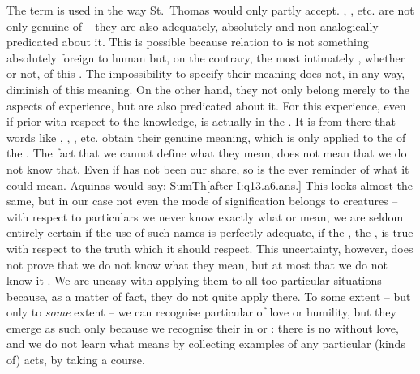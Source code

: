 The term  is used in the way St.~Thomas would only partly
accept.
, , etc. are not only genuine  of 
-- they are also adequately, absolutely and non-analogically predicated about
it.  This is possible because  relation to  is not
something absolutely foreign to human  but, on the contrary, the
most intimately , whether  or not,  of
this . The impossibility to specify  their meaning
does not, in any way, diminish  of this meaning. On the other
hand, they not only belong merely  to the aspects of
 experience, but are also predicated  about it.
For this experience, even if prior with respect to the 
knowledge, is actually  in the . It is from there
that words like , , , etc.  obtain their
genuine meaning, which is only  applied to the 
 of the . The fact that we cannot define
 what they mean, does not mean that we do not know that. Even if
 has not been our share, so  is the ever
 reminder of what it could mean. Aquinas
would say: \citet{as regards what these names signify, they are applied
  primarily to God but as regards the imposition of the names, they are
  primarily applied to creatures which we know first -- hence they have a mode
  of signification which belongs to creatures.}{SumTh}{[after I:q13.a6.ans.]} This
looks almost the same, but in our case not even the mode of signification
belongs to creatures -- with respect to particulars we never know exactly what
 or  mean, we are seldom entirely certain if the use of
such names is perfectly adequate, if the , the , is true
with respect to the  truth which it should respect.  This
uncertainty, however, does not prove that we do not know what they mean, but at
most that we do not know it . We are uneasy with applying them to
all too particular situations because, as a matter of fact, they do not quite
apply there. To some extent -- but only to {\em some} extent -- we can recognise
particular  of love or humility, but they emerge as such only because
we recognise their  in  or : there is no
 without love, and we do not learn what  means by
collecting examples of any particular (kinds of) acts, by taking a course.

